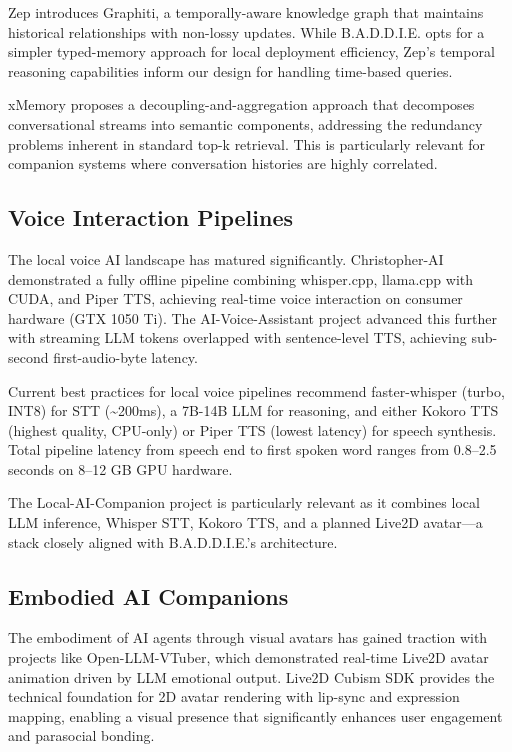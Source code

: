 \documentclass[sigconf]{acmart}
\begin{document}
Zep \cite{arxiv2501.13956} introduces Graphiti, a temporally-aware knowledge graph that maintains historical relationships with non-lossy updates. While B.A.D.D.I.E. opts for a simpler typed-memory approach for local deployment efficiency, Zep's temporal reasoning capabilities inform our design for handling time-based queries.

xMemory \cite{arxiv2602.02007} proposes a decoupling-and-aggregation approach that decomposes conversational streams into semantic components, addressing the redundancy problems inherent in standard top-k retrieval. This is particularly relevant for companion systems where conversation histories are highly correlated.

\subsection{Voice Interaction Pipelines}

The local voice AI landscape has matured significantly. Christopher-AI \cite{christopher-ai} demonstrated a fully offline pipeline combining whisper.cpp, llama.cpp with CUDA, and Piper TTS, achieving real-time voice interaction on consumer hardware (GTX 1050 Ti). The AI-Voice-Assistant project \cite{hemantbk-ai} advanced this further with streaming LLM tokens overlapped with sentence-level TTS, achieving sub-second first-audio-byte latency.

Current best practices for local voice pipelines \cite{insiderllm2026voice} recommend faster-whisper (turbo, INT8) for STT (\textasciitilde 200ms), a 7B-14B LLM for reasoning, and either Kokoro TTS (highest quality, CPU-only) or Piper TTS (lowest latency) for speech synthesis. Total pipeline latency from speech end to first spoken word ranges from 0.8--2.5 seconds on 8--12 GB GPU hardware.

The Local-AI-Companion project \cite{liilk-companion} is particularly relevant as it combines local LLM inference, Whisper STT, Kokoro TTS, and a planned Live2D avatar---a stack closely aligned with B.A.D.D.I.E.'s architecture.

\subsection{Embodied AI Companions}

The embodiment of AI agents through visual avatars has gained traction with projects like Open-LLM-VTuber, which demonstrated real-time Live2D avatar animation driven by LLM emotional output. Live2D Cubism SDK provides the technical foundation for 2D avatar rendering with lip-sync and expression mapping, enabling a visual presence that significantly enhances user engagement and parasocial bonding.
\end{document}
